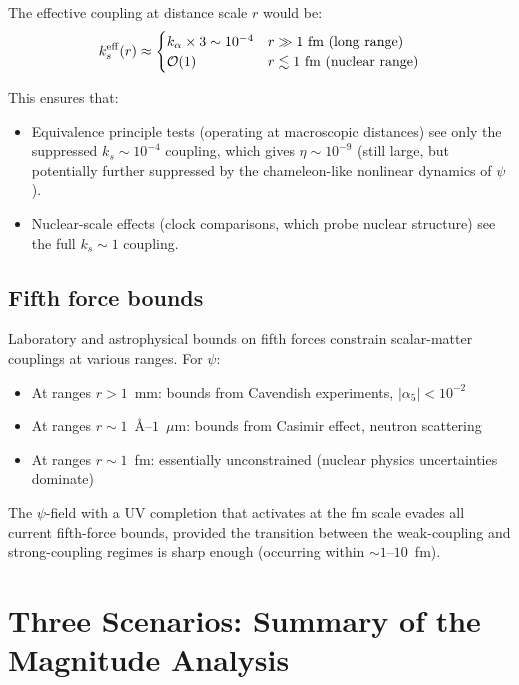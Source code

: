 \documentclass[aps,prd,twocolumn,superscriptaddress,floatfix,nofootinbib]{revtex4-2}
\renewcommand{\order}[1]{\mathcal{O}\!\left(#1\right)}
\begin{document}
The effective coupling at distance scale $r$ would be:
\begin{equation}
k_s^{\rm eff}(r) \approx
\begin{cases}
k_\alpha \times 3 \sim 10^{-4} & r \gg 1 \text{ fm (long range)} \\
\order{1} & r \lesssim 1 \text{ fm (nuclear range)}
\end{cases}
\end{equation}

This ensures that:
\begin{itemize}
\item Equivalence principle tests (operating at macroscopic distances) see only
the suppressed $k_s \sim 10^{-4}$ coupling, which gives $\eta \sim 10^{-9}$
(still large, but potentially further suppressed by the chameleon-like nonlinear
dynamics of $\psi$).
\item Nuclear-scale effects (clock comparisons, which probe nuclear structure)
see the full $k_s \sim 1$ coupling.
\end{itemize}

\subsection{Fifth force bounds}

Laboratory and astrophysical bounds on fifth forces constrain scalar-matter
couplings at various ranges. For $\psi$:
\begin{itemize}
\item At ranges $r > 1$~mm: bounds from Cavendish experiments, $|\alpha_5| <
10^{-2}$
\item At ranges $r \sim 1$~\AA--$1$~$\mu$m: bounds from Casimir effect, neutron
scattering
\item At ranges $r \sim 1$~fm: essentially unconstrained (nuclear physics
uncertainties dominate)
\end{itemize}

The $\psi$-field with a UV completion that activates at the fm scale evades all
current fifth-force bounds, provided the transition between the weak-coupling and
strong-coupling regimes is sharp enough (occurring within $\sim 1$--$10$~fm).


\section{Three Scenarios: Summary of the Magnitude Analysis}
\label{sec:scenarios}
\end{document}
